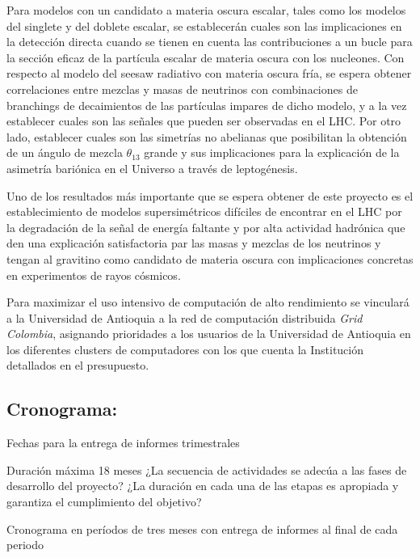 \begin{darkmatter}
  Para modelos con un candidato a materia oscura escalar, tales como
  los modelos del singlete y del doblete escalar, se establecerán
  cuales son las implicaciones en la detección directa cuando se
  tienen en cuenta las contribuciones a un bucle para la sección
  eficaz de la partícula escalar de materia oscura con los
  nucleones. Con respecto al modelo del seesaw radiativo con materia
  oscura fría, se espera obtener correlaciones entre mezclas y masas
  de neutrinos con combinaciones de branchings de decaimientos de las
  partículas impares de dicho modelo, y a la vez establecer cuales son
  las señales que pueden ser observadas en el LHC. Por otro lado,
  establecer cuales son las simetrías no abelianas que posibilitan la
  obtención de un ángulo de mezcla $\theta_{13}$ grande y sus
  implicaciones para la explicación de la asimetría bariónica en el
  Universo a través de leptogénesis.
\end{darkmatter}

Uno de los resultados más importante que se espera obtener de este
proyecto es el establecimiento de modelos supersimétricos difíciles de
encontrar en el LHC por la degradación de la señal de energía faltante
y por alta actividad hadrónica que den una explicación satisfactoria
par las masas y mezclas de los neutrinos y tengan al gravitino como
candidato de materia oscura con implicaciones concretas en
experimentos de rayos cósmicos.

Para maximizar el uso intensivo de computación de alto rendimiento
se vinculará a la Universidad de Antioquia a la red de computación
distribuida \emph{Grid Colombia}, asignando prioridades a los usuarios
de la Universidad de Antioquia en los diferentes clusters de
computadores con los que cuenta la Institución detallados en el
presupuesto. 

\subsection{Cronograma:                                    }
\begin{evaluacion}
  Fechas para la entrega de informes trimestrales
\end{evaluacion}

\begin{instrucciones}
Duración máxima 18 meses
  ¿La secuencia de actividades se adecúa a las fases de desarrollo del proyecto? ¿La duración en cada una de las etapas es apropiada y garantiza el cumplimiento del objetivo?
\end{instrucciones}
Cronograma en períodos de tres meses con entrega de informes al final
de cada periodo


